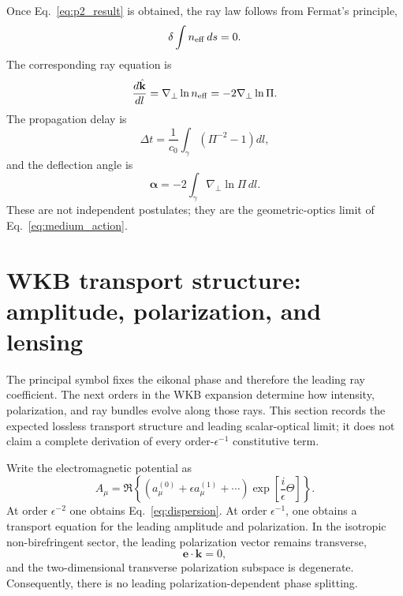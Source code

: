 \documentclass[12pt]{article}
\begin{document}
Once Eq.~\eqref{eq:p2_result} is obtained, the ray law follows from Fermat's principle,
\begin{equation}
 \delta\int n_{\rm eff}\,ds=0.
\label{eq:fermat}
\end{equation}
The corresponding ray equation is
\begin{equation}
 \frac{d\hat{\mathbf k}}{dl}
 =\nabla_\perp\ln n_{\rm eff}
 =-2\nabla_\perp\ln\Pi.
\label{eq:ray_eq}
\end{equation}
The propagation delay \cite{Shapiro1964,Will2014} is
\begin{equation}
 \Delta t=\frac{1}{c_0}\int_\gamma\left(\Pi^{-2}-1\right)dl,
\label{eq:delay}
\end{equation}
and the deflection angle is
\begin{equation}
 \boldsymbol\alpha=-2\int_\gamma\nabla_\perp\ln\Pi\,dl.
\label{eq:deflection}
\end{equation}
These are not independent postulates; they are the geometric-optics limit of Eq.~\eqref{eq:medium_action}.

\section{WKB transport structure: amplitude, polarization, and lensing}
\label{sec:transport}

The principal symbol fixes the eikonal phase and therefore the leading ray coefficient.  The next orders in the WKB expansion determine how intensity, polarization, and ray bundles evolve along those rays.  This section records the expected lossless transport structure and leading scalar-optical limit; it does not claim a complete derivation of every order-\(\epsilon^{-1}\) constitutive term.

Write the electromagnetic potential as
\begin{equation}
 A_\mu=\Re\left\{
 \left(a_\mu^{(0)}+\epsilon a_\mu^{(1)}+\cdots\right)
 \exp\left[\frac{i}{\epsilon}\Theta\right]
 \right\}.
\label{eq:transport_ansatz}
\end{equation}
At order $\epsilon^{-2}$ one obtains Eq.~\eqref{eq:dispersion}.  At order $\epsilon^{-1}$, one obtains a transport equation for the leading amplitude and polarization.  In the isotropic non-birefringent sector, the leading polarization vector remains transverse,
\begin{equation}
 \mathbf e\cdot\mathbf k=0,
\label{eq:transverse_polarization}
\end{equation}
and the two-dimensional transverse polarization subspace is degenerate.  Consequently, there is no leading polarization-dependent phase splitting.
\end{document}
